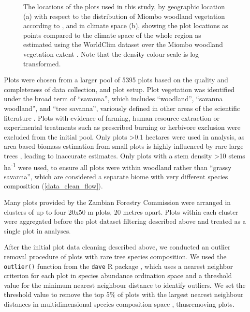 \documentclass[11pt,a4paper]{article}
\begin{document}
\begin{figure}[H]
	\centering
    \qquad
{}%
\caption{The locations of the \nplots{} plots used in this study, by geographic location (a) with respect to the distribution of Miombo woodland vegetation according to \citet{White1987}, and in climate space (b), showing the plot locations as points compared to the climate space of the whole region as estimated using the WorldClim dataset over the Miombo woodland vegetation extent \citep{Fick2017}. Note that the density colour scale is log-transformed.}
\end{figure}

Plots were chosen from a larger pool of 5395 plots based on the quality and completeness of data collection, and plot setup. Plot vegetation was identified under the broad term of ``savanna'', which includes ``woodland'', ``savanna woodland'', and ``tree savanna'', variously defined in other areas of the scientific literature \citep{Ratnam2011, Hill2010}. Plots with evidence of farming, human resource extraction or experimental treatments such as prescribed burning or herbivore exclusion were excluded from the initial pool. Only plots >0.1 hectares were used in analysis, as area based biomass estimation from small plots is highly influenced by rare large trees \citep{Stegen2011}, leading to inaccurate estimates. Only plots with a stem density >10 stems ha\textsuperscript{-1} were used, to ensure all plots were within woodland rather than ``grassy savanna'', which are considered a separate biome with very different species composition \citep{Parr2014} (\autoref{data_clean_flow}).

Many plots provided by the Zambian Forestry Commission were arranged in clusters of up to four 20x50 m plots, 20 metres apart. Plots within each cluster were aggregated before the plot dataset filtering described above and treated as a single plot in analyses.

After the initial plot data cleaning described above, we conducted an outlier removal procedure of plots with rare tree species composition. We used the \verb|outlier()| function from the \verb|dave| R package \citep{dave}, which uses a nearest neighbor criterion for each plot in species abundance ordination space and a threshold value for the minimum nearest neighbour distance to identify outliers. We set the threshold value to remove the top 5\% of plots with the largest nearest neighbour distances in multidimensional species composition space \citep{Otto2013}, thusremoving \noutliers{} plots.
\end{document}
